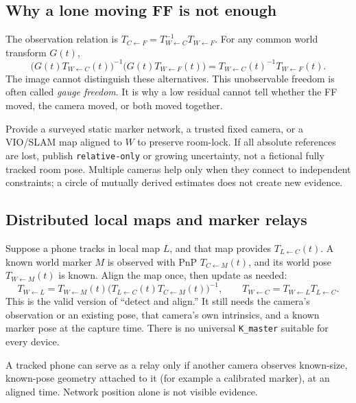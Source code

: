 \documentclass[11pt,a4paper]{article}
\newcommand{\T}[2]{T_{#1\leftarrow #2}}
\begin{document}
\subsection{Why a lone moving FF is not enough}
The observation relation is
$\T{C}{F}=\T{W}{C}^{-1}\T{W}{F}$.
For any common world transform $G(t)$,
\begin{equation}
\bigl(G(t)\T{W}{C}(t)\bigr)^{-1}
\bigl(G(t)\T{W}{F}(t)\bigr)
=\T{W}{C}(t)^{-1}\T{W}{F}(t).
\label{eq:gauge}
\end{equation}
The image cannot distinguish these alternatives.
This unobservable freedom is often called \emph{gauge freedom}.
It is why a low residual cannot tell whether the FF moved, the camera moved,
or both moved together.

Provide a surveyed static marker network, a trusted fixed camera, or a
VIO/SLAM map aligned to $W$ to preserve room-lock. If all absolute references
are lost, publish \texttt{relative-only} or growing uncertainty, not a
fictional fully tracked room pose. Multiple cameras help only when they
connect to independent constraints; a circle of mutually derived estimates
does not create new evidence.

\subsection{Distributed local maps and marker relays}
Suppose a phone tracks in local map $L$, and that map provides
$\T{L}{C}(t)$. A known world marker $M$ is observed with PnP
$\T{C}{M}(t)$, and its world pose $\T{W}{M}(t)$ is known.
Align the map once, then update as needed:
\begin{equation}
\T{W}{L}=
\T{W}{M}(t)
\bigl(\T{L}{C}(t)\T{C}{M}(t)\bigr)^{-1},\qquad
\T{W}{C}=\T{W}{L}\T{L}{C}.
\label{eq:mapalign}
\end{equation}
This is the valid version of ``detect and align.'' It still needs the
camera's observation or an existing pose, that camera's own intrinsics,
and a known marker pose at the capture time. There is no universal
\texttt{K\_master} suitable for every device.

A tracked phone can serve as a relay only if another camera observes
known-size, known-pose geometry attached to it (for example a calibrated
marker), at an aligned time. Network position alone is not visible evidence.
\end{document}
